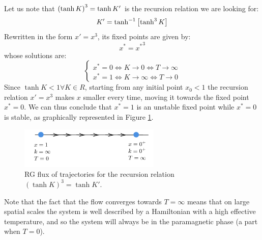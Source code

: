 \documentclass[../../Main/Main.tex]{subfiles}
\begin{document}
Let us note that \( \qty(\tanh K)^3 = \tanh K'  \) is the recursion relation we are looking for:
\begin{equation}
  K'= \tanh^{-1} \qty[ \tanh^3 K]
\end{equation}
Rewritten in the form \( x' = x^3 \), its fixed points are given by:
\begin{equation*}
  x^* = {x^*}^3
\end{equation*}
whose solutions are:
\begin{equation}
  \begin{cases}
   x^* = 0 \iff K \rightarrow 0 \iff T \rightarrow \infty \\
   x^* = 1 \iff K \rightarrow \infty  \iff T \rightarrow 0
  \end{cases}
\end{equation}
Since \( \tanh K < 1 \forall K \in R \), starting from any initial point  \( x_0 < 1 \) the recursion relation \(  x' = x^3 \) makes \( x \) smaller every time, moving it towards the fixed point \( x^*=0 \). We can thus conclude that \( x^*=1 \) is an unstable fixed point while \( x^*=0 \) is stable, as graphically represented in Figure \ref{fig:20_3}.

\begin{figure}[H]
\centering
\includegraphics[width=0.6\textwidth]{./img/3.pdf}
\caption{\label{fig:20_3} RG flux of trajectories for the recursion relation \( (\tanh K)^{3}=\tanh K' \).}
\end{figure}

Note that the fact that the flow converges towards \( T = \infty  \)  means that on large spatial scales the system is well described by a Hamiltonian with a high effective temperature, and so the system will always be in the paramagnetic phase (a part when \( T=0 \)).
\end{document}
